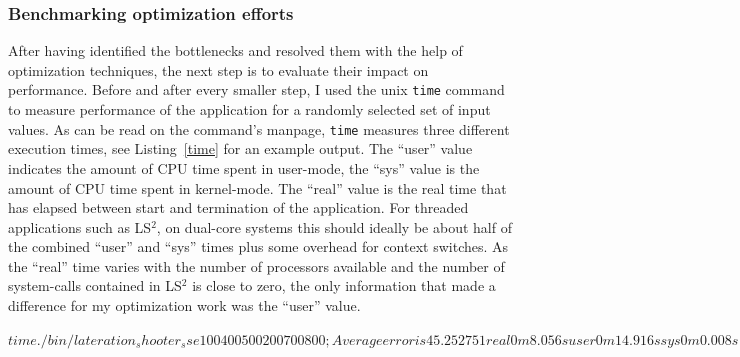 \subsubsection{Benchmarking optimization efforts}
\label{benchmarking}
After having identified the bottlenecks and resolved them with the help of optimization techniques, the next step is to evaluate their impact on performance. Before and after every smaller step, I used the unix \texttt{time} command to measure performance of the application for a randomly selected set of input values. As can be read on the command's manpage, \texttt{time} measures three different execution times, see Listing~\ref{time} for an example output. The ``user'' value indicates the amount of CPU time spent in user-mode, the ``sys'' value is the amount of CPU time spent in kernel-mode. The ``real'' value is the real time that has elapsed between start and termination of the application. For threaded applications such as LS$^{2}$, on dual-core systems this should ideally be about half of the combined ``user'' and ``sys'' times plus some overhead for context switches. As the ``real'' time varies with the number of processors available and the number of system-calls contained in LS$^{2}$ is close to zero, the only information that made a difference for my optimization work was the ``user'' value.

\begin{shell}[caption={Example output of the unix \texttt{time} command},label=time]
$ time { ./bin/lateration_shooter_sse 100 400 500 200 700 800 ; }
Average error is 45.252751

real    0m8.056s
user    0m14.916s
sys     0m0.008s
$
\end{shell}


